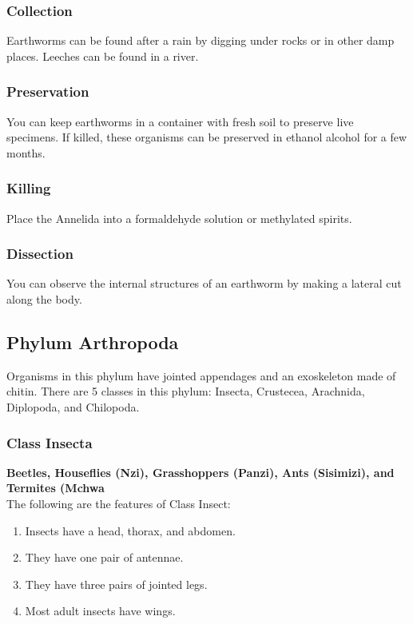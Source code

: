 \subsubsection{Collection}
Earthworms can be found after a rain by digging under rocks or in other damp places. Leeches can be found in a river.

\subsubsection{Preservation} 
You can keep earthworms in a container with fresh soil to preserve live specimens. If killed, these organisms can be preserved in ethanol alcohol for a few months. 

\subsubsection{Killing}
Place the Annelida into a formaldehyde solution or methylated spirits.

\subsubsection{Dissection}
You can observe the internal structures of an earthworm by making a lateral cut along the body.

\subsection{Phylum Arthropoda}
Organisms in this phylum have jointed appendages and an exoskeleton made of chitin. There are 5 classes in this phylum: Insecta, Crustecea, Arachnida, Diplopoda, and Chilopoda.

\subsubsection{Class Insecta}
\textbf{Beetles, Houseflies (Nzi), Grasshoppers (Panzi), Ants (Sisimizi), and Termites (Mchwa}\\
The following are the features of Class Insect:
\begin{enumerate}
\item{Insects have a head, thorax, and abdomen.}
\item{They have one pair of antennae.}
\item{They have three pairs of jointed legs.}
\item{Most adult insects have wings.}
\end{enumerate}

